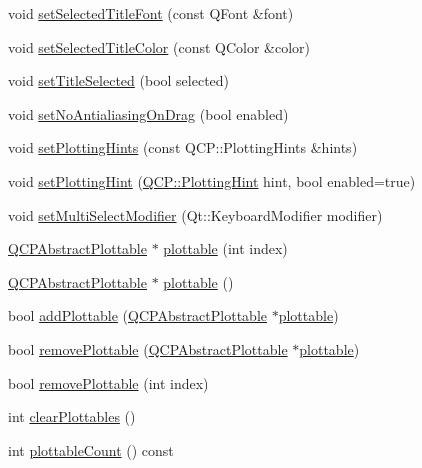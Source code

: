 \begin{DoxyCompactItemize}
\item 
void \hyperlink{classQCustomPlot_a2face1cc6d467f27aa1a6f3ba5ba112d}{set\-Selected\-Title\-Font} (const Q\-Font \&font)
\item 
void \hyperlink{classQCustomPlot_ad0897d7ba31a3994d7323f568cdcd2d8}{set\-Selected\-Title\-Color} (const Q\-Color \&color)
\item 
void \hyperlink{classQCustomPlot_aa89e06c04804ff2a0994ccb1aa80d131}{set\-Title\-Selected} (bool selected)
\item 
void \hyperlink{classQCustomPlot_a775bdcb6329d44701aeaa6135b0e5265}{set\-No\-Antialiasing\-On\-Drag} (bool enabled)
\item 
void \hyperlink{classQCustomPlot_a94a33cbdadbbac5934843508bcfc210d}{set\-Plotting\-Hints} (const Q\-C\-P\-::\-Plotting\-Hints \&hints)
\item 
void \hyperlink{classQCustomPlot_a3b7c97bb6c16464e9e15190c07abe9a9}{set\-Plotting\-Hint} (\hyperlink{namespaceQCP_a5400e5fcb9528d92002ddb938c1f4ef4}{Q\-C\-P\-::\-Plotting\-Hint} hint, bool enabled=true)
\item 
void \hyperlink{classQCustomPlot_a8fc96e3b5138a06759a2a90c166df516}{set\-Multi\-Select\-Modifier} (Qt\-::\-Keyboard\-Modifier modifier)
\item 
\hyperlink{classQCPAbstractPlottable}{Q\-C\-P\-Abstract\-Plottable} $\ast$ \hyperlink{classQCustomPlot_a32de81ff53e263e785b83b52ecd99d6f}{plottable} (int index)
\item 
\hyperlink{classQCPAbstractPlottable}{Q\-C\-P\-Abstract\-Plottable} $\ast$ \hyperlink{classQCustomPlot_adea38bdc660da9412ba69fb939031567}{plottable} ()
\item 
bool \hyperlink{classQCustomPlot_ab7ad9174f701f9c6f64e378df77927a6}{add\-Plottable} (\hyperlink{classQCPAbstractPlottable}{Q\-C\-P\-Abstract\-Plottable} $\ast$\hyperlink{classQCustomPlot_a32de81ff53e263e785b83b52ecd99d6f}{plottable})
\item 
bool \hyperlink{classQCustomPlot_af3dafd56884208474f311d6226513ab2}{remove\-Plottable} (\hyperlink{classQCPAbstractPlottable}{Q\-C\-P\-Abstract\-Plottable} $\ast$\hyperlink{classQCustomPlot_a32de81ff53e263e785b83b52ecd99d6f}{plottable})
\item 
bool \hyperlink{classQCustomPlot_afc210e0021480f8119bccf37839dbcc8}{remove\-Plottable} (int index)
\item 
int \hyperlink{classQCustomPlot_a9a409bb3201878adb7ffba1c89c4e004}{clear\-Plottables} ()
\item 
int \hyperlink{classQCustomPlot_a2dbfbf15dc38713f9a1c445a3dd2e989}{plottable\-Count} () const 

\end{DoxyCompactItemize}
